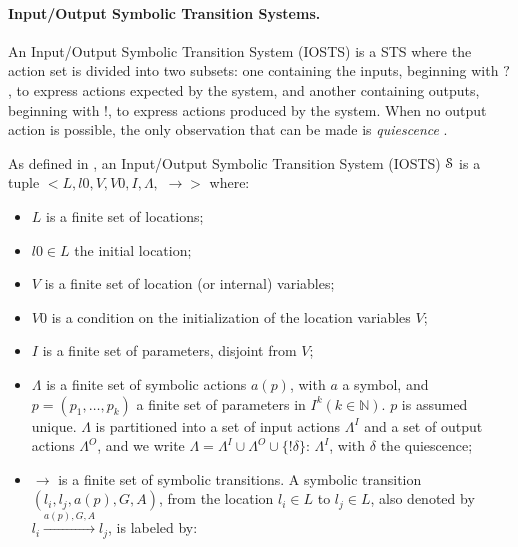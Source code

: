 \paragraph{Input/Output Symbolic Transition Systems.}
\label{sec:definitions:iosts}

An Input/Output Symbolic Transition System (IOSTS)
\cite{Rusu:2000:AST:647982.743536} is a STS where the action set
is divided into two subsets: one containing the inputs, beginning
with $?$, to express actions expected by the system, and another
containing outputs, beginning with $!$, to express actions
produced by the system. When no output action is possible, the
only observation that can be made is \emph{quiescence}
\cite{Tre96}.

\begin{definition}
    As defined in \cite{Rusu:2000:AST:647982.743536}, an
    Input/Output Symbolic Transition System (IOSTS)
    $\EuScript{S}$ is a tuple $<L,l0,V,V0,I,\Lambda,$
    $\rightarrow>$ where:

\begin{itemize}
    \item $L$ is a finite set of locations;

    \item $l0 \in L$ the initial location;

    \item $V$ is a finite set of location (or internal)
        variables;

    \item $V0$ is a condition on the initialization of the
        location variables $V$;

    \item $I$ is a finite set of parameters, disjoint from $V$;

    \item $\Lambda$ is a finite set of symbolic actions $a(p)$,
        with $a$ a symbol, and $p = (p_1,\dots,p_k)$ a finite set
        of parameters in $I^k(k \in \mathbb{N})$. $p$ is assumed
        unique. $\Lambda$ is partitioned into a set of input
        actions $\Lambda^I$ and a set of output actions
        $\Lambda^O$, and we write $\Lambda = \Lambda^I \cup
        \Lambda^O \cup \{!\delta \}$: $\Lambda^I$, with $\delta$
        the quiescence;

    \item $\rightarrow$ is a finite set of symbolic transitions.
        A symbolic transition $(l_i,l_j,a(p),G,A)$, from the
        location $l_i \in L$ to $l_j \in L$, also denoted by $l_i
        \xrightarrow{a(p),G,A} l_j$, is labeled by:


\end{itemize}
\end{definition}
